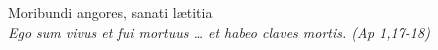 


\def\greinitialformat#1{%
{\fontsize{39}{39}\selectfont #1}%
}




\vspace{0.3cm}
\begin{center}

Moribundi angores, sanati lætitia\\
\textit{\small Ego sum vivus et fui mortuus … et habeo claves mortis. (Ap 1,17-18)}
\end{center}
